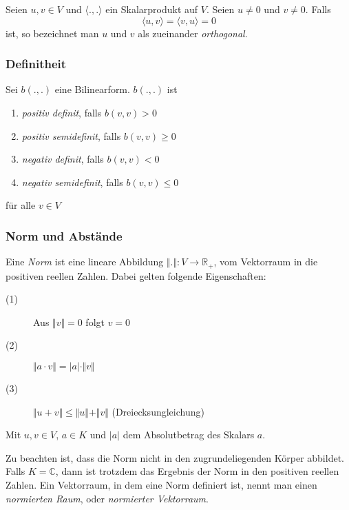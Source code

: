 \begin{definition}
Seien $u,v \in V$ und $\langle .,.\rangle$ ein Skalarprodukt auf $V$. Seien $u\ne 0$ und $v\ne 0$. Falls 
\[ \langle u,v \rangle = \langle v,u \rangle = 0\]
ist, so bezeichnet man $u$ und $v$ als zueinander \textsl{orthogonal}. 
\end{definition}


\subsubsection{Definitheit}


\begin{definition}
Sei $b(.,.)$ eine Bilinearform. $b(.,.)$ ist

\begin{enumerate}
\item \textsl{positiv definit}, falls $b(v,v)>0$
\item \textsl{positiv semidefinit}, falls $b(v,v)\ge 0$
\item \textsl{negativ definit}, falls $b(v,v) <0$
\item \textsl{negativ semidefinit}, falls $b(v,v)\le 0$
\end{enumerate}
für alle $v\in V $
\end{definition}



\subsubsection{Norm und Abstände}

\begin{definition}
Eine \textsl{Norm} ist eine lineare Abbildung $\Vert . \Vert : V \longrightarrow \mathbb{R}_+$, vom Vektorraum in die positiven reellen Zahlen. Dabei gelten folgende Eigenschaften:
\begin{description}
\item[(1)] Aus $\Vert v\Vert = 0$ folgt $v=0$
\item[(2)] $\Vert a\cdot v\Vert = \vert a\vert \cdot \Vert v\Vert$
\item[(3)] $\Vert u+v\Vert \le \Vert u\Vert + \Vert v\Vert $ (Dreiecksungleichung)
\end{description}
Mit $u,v\in V$, $a\in K$ und $\vert a\vert$ dem Absolutbetrag des Skalars $a$.
\end{definition}
Zu beachten ist, dass die Norm nicht in den zugrundeliegenden Körper abbildet. Falls $K=\mathbb{C}$, dann ist trotzdem das Ergebnis der Norm in den positiven reellen Zahlen. Ein Vektorraum, in dem eine Norm definiert ist, nennt man einen \textsl{normierten Raum}, oder \textsl{normierter Vektorraum}.

